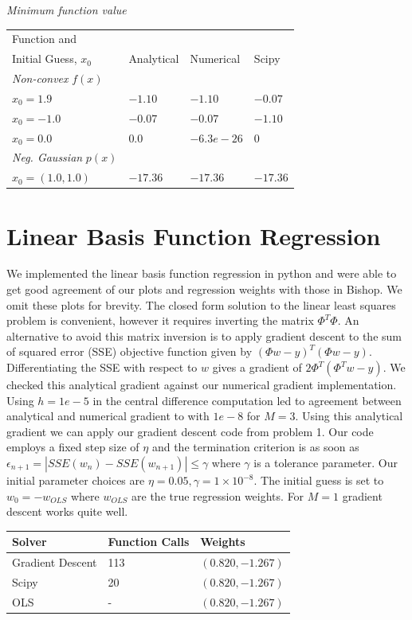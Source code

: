 \documentclass{article}
\begin{document}
\textit{Minimum function value}

\begin{tabular}{|l|l|l|l|}
\hline
Function and & & &\\ Initial Guess, $x_0$ & Analytical & Numerical & Scipy \\ \hline
\textit{Non-convex} $f(x)$ & & &\\ \hline
$x_0 = 1.9$ & $-1.10$ & $-1.10$ & $-0.07$\\\hline
$x_0 = -1.0$ & $-0.07$ & $-0.07$ & $-1.10$ \\ \hline
$x_0 = 0.0$ & $0.0$ & $-6.3e-26$ & $0$\\ \hline
\textit{Neg. Gaussian} $p(x)$ & & & \\ \hline
$x_0 = (1.0,1.0)$ & $-17.36$ & $-17.36$ & $-17.36$ \\ \hline
\end{tabular}



\section{Linear Basis Function Regression}
We implemented the linear basis function regression in python and were able to get good agreement of our plots and regression weights with those in Bishop. We omit these plots for brevity. The closed form solution to the linear least squares problem is convenient, however it requires inverting the matrix $\Phi^T \Phi$. An alternative to avoid this matrix inversion is to apply gradient descent to the sum of squared error (SSE) objective function given by $(\Phi w - y)^T(\Phi w - y)$. Differentiating the SSE with respect to $w$ gives a gradient of $2\Phi^T(\Phi^T w - y)$. We checked this analytical gradient against our numerical gradient implementation. Using $h = 1e-5$ in the central difference computation led to agreement between analytical and numerical gradient to with $1e-8$ for $M = 3$. Using this analytical gradient we can apply our gradient descent code from problem 1. Our code employs a fixed step size of $\eta$ and the termination criterion is as soon as $\epsilon_{n+1} = |SSE(w_n) - SSE(w_{n+1})| \leq \gamma $ where $\gamma$ is a tolerance parameter. Our initial parameter choices are $\eta = 0.05, \gamma = 1 \times 10^{-8}$. The initial guess is set to $w_0 = -w_{OLS}$ where $w_{OLS}$ are the true regression weights. For $M = 1$ gradient descent works quite well.

\begin{tabular}{|l|l|l|}
\hline
Solver & Function Calls & Weights \\ \hline
Gradient Descent & 113 & $(0.820, -1.267)$ \\ \hline
Scipy & 20 & $(0.820, -1.267)$ \\ \hline
OLS  & - & $(0.820, -1.267)$ \\ \hline
\end{tabular}
%
\end{document}
